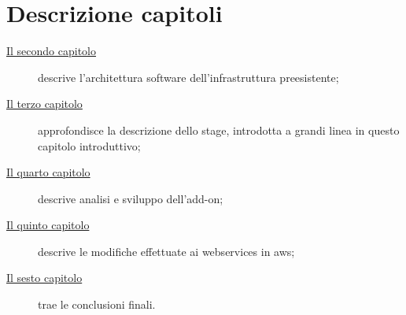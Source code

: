 \section{Descrizione capitoli}
\begin{description}
	\item[{\hyperref[cap:descrizione-architettura]{Il secondo capitolo}}] descrive l'architettura software dell'infrastruttura preesistente;
	
	\item[{\hyperref[cap:descrizione-stage]{Il terzo capitolo}}] approfondisce la descrizione dello stage, introdotta a grandi linea in questo capitolo introduttivo;
	
	\item[{\hyperref[cap:sviluppo-addon]{Il quarto capitolo}}] descrive analisi e sviluppo dell'add-on;
	
	\item[{\hyperref[cap:webservices]{Il quinto capitolo}}] descrive le modifiche effettuate ai webservices in \gls{aws};
	
	\item[{\hyperref[cap:conclusioni]{Il sesto capitolo}}] trae le conclusioni finali.
\end{description}